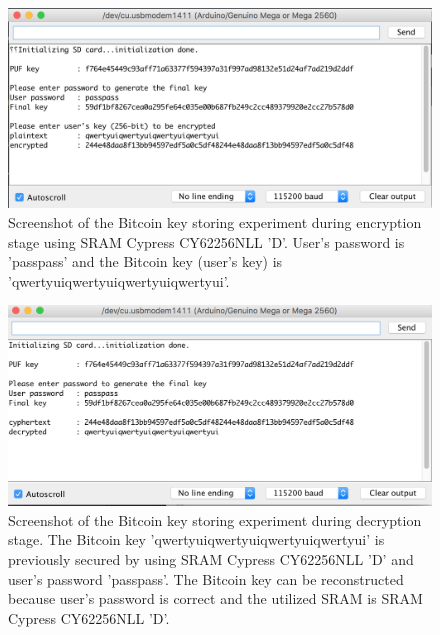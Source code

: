 \begin{figure}[tph!]
    \centerline{\includegraphics[width={\textwidth}]{images/D_encrypt}}
    \caption{Screenshot of the Bitcoin key storing experiment during encryption stage using SRAM Cypress CY62256NLL 'D'.
    User's password is 'passpass' and the Bitcoin key (user's key) is 'qwertyuiqwertyuiqwertyuiqwertyui'.}
    \label{fig:D_encrypt}
\end{figure}

\begin{figure}[tph!]
    \centerline{\includegraphics[width={\textwidth}]{images/D_decrypt_correct}}
    \caption{Screenshot of the Bitcoin key storing experiment during decryption stage. The Bitcoin key 'qwertyuiqwertyuiqwertyuiqwertyui' is previously secured by using SRAM Cypress CY62256NLL 'D' and user's password 'passpass'.
    The Bitcoin key can be reconstructed because user's password is correct and the utilized SRAM is SRAM Cypress CY62256NLL 'D'.}
    \label{fig:D_decrypt_correct}
\end{figure}

